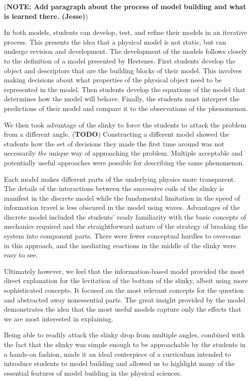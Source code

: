 \documentclass[prb,preprint,superscriptaddress]{revtex4-1}
\newcommand{\TODO}[1]{\marginpar{\raggedright\scriptsize\textbf{TODO:} #1} (\textbf{TODO})}
\newcommand{\NOTE}[1]{\marginpar{\footnotesize\textbf{NOTE}} (\textbf{NOTE: #1})}
\begin{document}
\NOTE{Add paragraph about the process of model building and what is learned there. (Jesse)}

In both models, students can develop, test, and refine their models in an iterative process.
This presents the idea that a physical model is not static, but can undergo revision and development.
The development of the models follows closely to the definition of a model presented by Hestenes\cite{hestenes1987}. First students develop the object and descriptors that are the building blocks of their model.
This involves making decisions about what properties of the physical object need to be represented in the model.
Then students develop the equations of the model that determines how the model will behave.
Finally, the students must interpret the predictions of their model and compare it to the observations of the phenomenon.

We then took advantage of the slinky to force the students to attack the problem
from a different angle.\TODO{Reword this sentence} Constructing a different model showed the students
how the set of decisions they made the first time around was not necessarily
\emph{the} unique way of approaching the problem. Multiple acceptable and potentially
useful approaches were possible for describing the same phenomenon.

Each model makes different parts of the underlying physics
more transparent. The details of the interactions between the successive coils
of the slinky is manifest in the discrete model while the fundamental
limitation in the speed of information travel is less obscured in the model
using waves. Advantages of the discrete model included the students' ready
familiarity with the basic concepts of mechanics required and the straightforward
nature of the strategy of breaking the system into component parts. There were
fewer conceptual hurdles to overcome in this approach, and the mediating
reactions in the middle of the slinky were easy to see. 

Ultimately however, we feel that the information-based model provided the
most direct explanation for the levitation of the bottom of the slinky, albeit
using more sophisticated concepts. It focused
on the most relevant concepts for the question and abstracted away
nonessential parts. The great insight provided by the
model demonstrates the idea that the most useful models
capture only the effects that we are most interested in explaining.

Being able to readily attack the slinky drop from multiple angles, combined with
the fact that the slinky was simple enough to be approachable by the students
in a hands-on fashion, made it an ideal centerpiece of a curriculum intended to
introduce students to model building and allowed us to highlight many of the
essential features of model building in the physical sciences.
\end{document}
